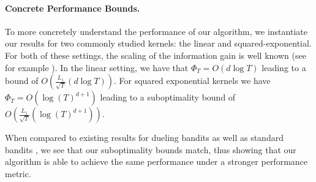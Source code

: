 \documentclass{article} \usepackage{iclr2023_conference,times}
\begin{document}
\paragraph{Concrete Performance Bounds.}
To more concretely understand the performance of our algorithm, we instantiate our results for two commonly studied kernels: the linear and squared-exponential.
For both of these settings, the scaling of the information gain is well known (see for example \cite{srinivas2009gaussian}).
In the linear setting, we have that $\Phi_T = O(d \log T)$ leading to a bound of $O \left( \tfrac{L_1}{\sqrt{T}} \left( d \log T \right) \right)$.
For squared exponential kernels we have $\Phi_T = O \left( \log(T)^{d + 1} \right)$ leading to a suboptimality bound of $O \left( \tfrac{L_1}{\sqrt{T}} \left(\log(T)^{d + 1} \right) \right)$.

When compared to existing results for dueling bandits \citep{xu2020zeroth} as well as standard bandits \citep{chowdhury2017kernelized}, we see that our suboptimality bounds match, thus showing that our algorithm is able to achieve the same performance under a stronger performance metric.
\end{document}

